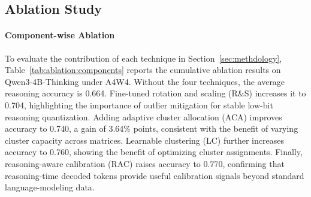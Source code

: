 \documentclass{article}
\begin{document}
\subsection{Ablation Study}

\paragraph{Component-wise Ablation}

\begin{table}[h]
\centering
\caption{Cumulative component ablation on Qwen3-4B-Thinking under A4W4. The base configuration uses fixed random rotation and SmoothQuant scaling. Each subsequent row adds the listed component cumulatively. AIME results are pass@1, and gains are in percentage points.}
\label{tab:ablation:components}
\par\vspace{-5pt}
\end{table}

To evaluate the contribution of each technique in Section~\ref{sec:methdology}, Table~\ref{tab:ablation:components} reports the cumulative ablation results on Qwen3-4B-Thinking under A4W4. Without the four techniques, the average reasoning accuracy is 0.664. Fine-tuned rotation and scaling (R\&S) increases it to 0.704, highlighting the importance of outlier mitigation for stable low-bit reasoning quantization. Adding adaptive cluster allocation (ACA) improves accuracy to 0.740, a gain of 3.64\% points, consistent with the benefit of varying cluster capacity across matrices. Learnable clustering (LC) further increases accuracy to 0.760, showing the benefit of optimizing cluster assignments. Finally, reasoning-aware calibration (RAC) raises accuracy to 0.770, confirming that reasoning-time decoded tokens provide useful calibration signals beyond standard language-modeling data.
\end{document}
